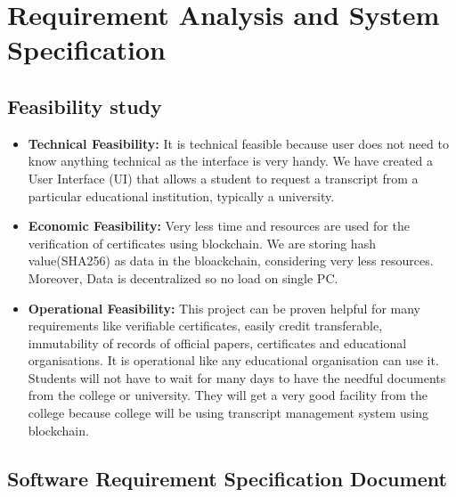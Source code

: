 \newpage
\section{Requirement Analysis and System Specification}

\subsection{Feasibility study}
\begin{itemize}
    \item \textbf{Technical Feasibility: } It is technical feasible because user does not need to know anything technical as the interface is very handy. We have created a User Interface (UI) that allows a student to request a transcript from a particular educational institution, typically a university. 
    
    \item \textbf{Economic Feasibility: } Very less time and resources are used for the verification of certificates using blockchain. We are storing hash value(SHA256) as data in the bloackchain, considering very less resources. Moreover, Data is decentralized so no load on single PC.
    
    \item \textbf{Operational Feasibility: } This project can be proven helpful for many requirements like verifiable certificates, easily credit transferable, immutability of records of official papers, certificates and educational organisations. It is operational like any educational organisation can use it. Students will not have to wait for many days to have the needful documents from the college or university. They will get a very good facility from the college because college will be using transcript management system using blockchain.
\end{itemize}

\subsection{Software Requirement Specification Document}

